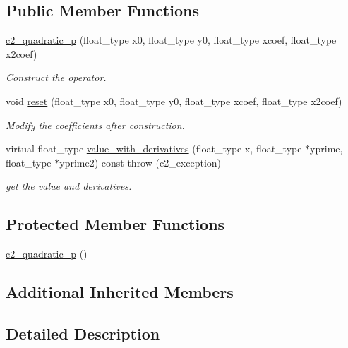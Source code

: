\subsection*{Public Member Functions}
\begin{DoxyCompactItemize}
\item 
\hyperlink{classc2__quadratic__p_a767070d7f86b63725c487fb4efa05dd3}{c2\+\_\+quadratic\+\_\+p} (float\+\_\+type x0, float\+\_\+type y0, float\+\_\+type xcoef, float\+\_\+type x2coef)
\begin{DoxyCompactList}\small\item\em Construct the operator. \end{DoxyCompactList}\item 
void \hyperlink{classc2__quadratic__p_a6db1d57b13356c732236b4df69a3570a}{reset} (float\+\_\+type x0, float\+\_\+type y0, float\+\_\+type xcoef, float\+\_\+type x2coef)
\begin{DoxyCompactList}\small\item\em Modify the coefficients after construction. \end{DoxyCompactList}\item 
virtual float\+\_\+type \hyperlink{classc2__quadratic__p_ade79e98941853a179b2be14b6cc6daa3}{value\+\_\+with\+\_\+derivatives} (float\+\_\+type x, float\+\_\+type $\ast$yprime, float\+\_\+type $\ast$yprime2) const   throw (c2\+\_\+exception)
\begin{DoxyCompactList}\small\item\em get the value and derivatives. \end{DoxyCompactList}\end{DoxyCompactItemize}
\subsection*{Protected Member Functions}
\begin{DoxyCompactItemize}
\item 
\hyperlink{classc2__quadratic__p_a1b125bace2fb30cdd154787e8c45fb40}{c2\+\_\+quadratic\+\_\+p} ()
\end{DoxyCompactItemize}
\subsection*{Additional Inherited Members}


\subsection{Detailed Description}

